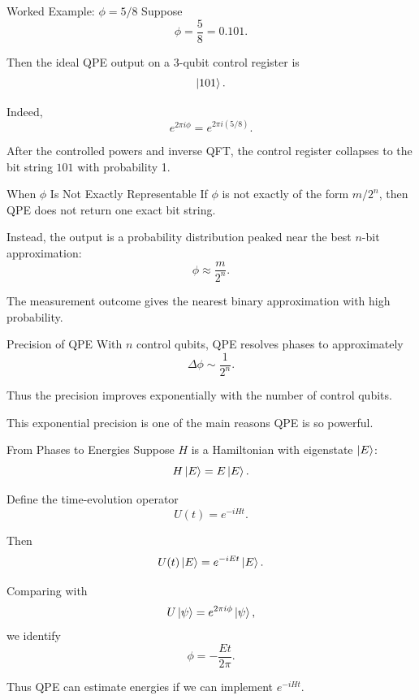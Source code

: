 \documentclass{beamer}
\begin{document}
\begin{frame}{Worked Example: \(\phi=5/8\)}
Suppose
\[
\phi = \frac{5}{8} = 0.101.
\]

Then the ideal QPE output on a 3-qubit control register is
\[
\ket{101}.
\]

Indeed,
\[
e^{2\pi i \phi} = e^{2\pi i (5/8)}.
\]

After the controlled powers and inverse QFT, the control register collapses to the bit string \(101\) with probability 1.
\end{frame}

\begin{frame}{When \(\phi\) Is Not Exactly Representable}
If \(\phi\) is not exactly of the form \(m/2^n\), then QPE does not return one exact bit string.

Instead, the output is a probability distribution peaked near the best \(n\)-bit approximation:
\[
\phi \approx \frac{m}{2^n}.
\]

The measurement outcome gives the nearest binary approximation with high probability.
\end{frame}

\begin{frame}{Precision of QPE}
With \(n\) control qubits, QPE resolves phases to approximately
\[
\Delta \phi \sim \frac{1}{2^n}.
\]

Thus the precision improves exponentially with the number of control qubits.

This exponential precision is one of the main reasons QPE is so powerful.
\end{frame}

\begin{frame}{From Phases to Energies}
Suppose \(H\) is a Hamiltonian with eigenstate \(\ket{E}\):
\[
H\ket{E} = E\ket{E}.
\]

Define the time-evolution operator
\[
U(t)=e^{-iHt}.
\]

Then
\[
U(t)\ket{E} = e^{-iEt}\ket{E}.
\]

Comparing with
\[
U\ket{\psi}=e^{2\pi i \phi}\ket{\psi},
\]
we identify
\[
\phi = -\frac{Et}{2\pi}.
\]

Thus QPE can estimate energies if we can implement \(e^{-iHt}\).
\end{frame}
\end{document}
